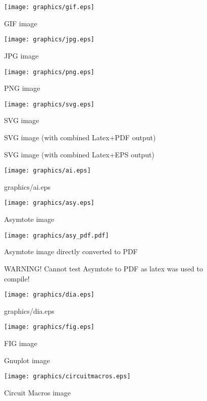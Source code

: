 \documentclass{scrartcl}
\begin{document}
\glsaddall
\begin{figure}
\texttt{[image: graphics/gif.eps]}
\caption{GIF image}
\end{figure}
\begin{figure}
\texttt{[image: graphics/jpg.eps]}
\caption{JPG image}
\end{figure}
\begin{figure}
\texttt{[image: graphics/png.eps]}
\caption{PNG image}
\end{figure}
\begin{figure}
\texttt{[image: graphics/svg.eps]}
\caption{SVG image}
\end{figure}
%
\begin{figure}
\ifpdf
	
	\caption{SVG image (with combined Latex+PDF output)}
\else
		
	\caption{SVG image (with combined Latex+EPS output)}
\fi
\end{figure}
%
\begin{figure}
\texttt{[image: graphics/ai.eps]}
\caption{graphics/ai.eps}
\end{figure}
\begin{figure}
\texttt{[image: graphics/asy.eps]}
\caption{Asymtote image}
\end{figure}
%
\begin{figure}
\ifpdf
	\texttt{[image: graphics/asy\_pdf.pdf]}
	\caption{Asymtote image directly converted to PDF}
\else
	\caption{WARNING! Cannot test Asymtote to PDF as latex was used to compile!}
\fi
\end{figure}
%
\begin{figure}
\texttt{[image: graphics/dia.eps]}
\caption{graphics/dia.eps}
\end{figure}
\begin{figure}
\texttt{[image: graphics/fig.eps]}
\caption{FIG image}
\end{figure}
\begin{figure}

\caption{Gnuplot image}
\end{figure}
\begin{figure}
\texttt{[image: graphics/circuitmacros.eps]}
\caption{Circuit Macros image}
\end{figure}
\clearpage
\printglossaries
\end{document}
